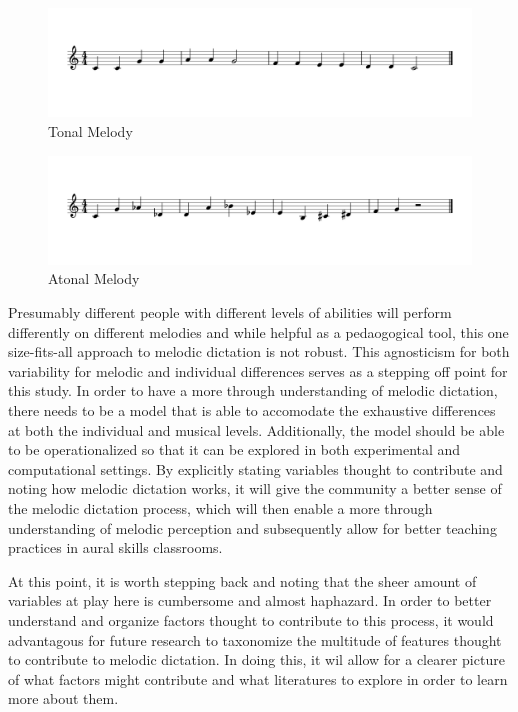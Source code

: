 \documentclass[]{book}
\begin{document}
\begin{figure}

{\centering \includegraphics[width=0.8\linewidth]{img/musicalexamples/MMD_Figure2-1} 

}

\caption{Tonal Melody}\label{fig:shortmelody1}
\end{figure}

\begin{figure}

{\centering \includegraphics[width=0.8\linewidth]{img/musicalexamples/MMD_Figure3-1} 

}

\caption{Atonal Melody}\label{fig:shortmelody2}
\end{figure}

Presumably different people with different levels of abilities will perform differently on different melodies and while helpful as a pedaogogical tool, this one size-fits-all approach to melodic dictation is not robust.
This agnosticism for both variability for melodic and individual differences serves as a stepping off point for this study.
In order to have a more through understanding of melodic dictation, there needs to be a model that is able to accomodate the exhaustive differences at both the individual and musical levels.
Additionally, the model should be able to be operationalized so that it can be explored in both experimental and computational settings.
By explicitly stating variables thought to contribute and noting how melodic dictation works, it will give the community a better sense of the melodic dictation process, which will then enable a more through understanding of melodic perception and subsequently allow for better teaching practices in aural skills classrooms.

At this point, it is worth stepping back and noting that the sheer amount of variables at play here is cumbersome and almost haphazard.
In order to better understand and organize factors thought to contribute to this process, it would advantagous for future research to taxonomize the multitude of features thought to contribute to melodic dictation.
In doing this, it wil allow for a clearer picture of what factors might contribute and what literatures to explore in order to learn more about them.
\end{document}
